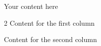 \documentclass{article}
\begin{document}
Your content here

\begin{multicols}{2}
Content for the first column
\end{multicols} 

Content for the second column
\end{document}
